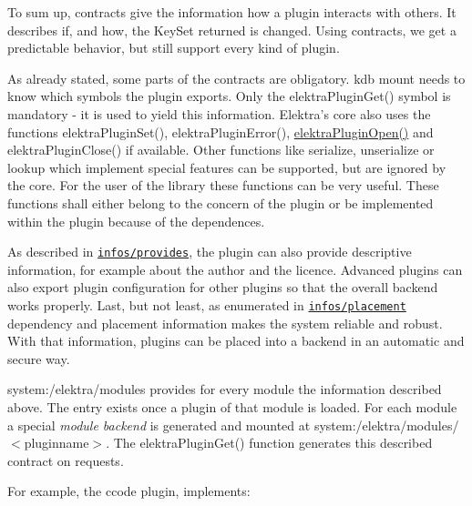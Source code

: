 To sum up, contracts give the information how a plugin interacts with others. It describes if, and how, the {\ttfamily Key\+Set} {\ttfamily returned} is changed. Using contracts, we get a predictable behavior, but still support every kind of plugin.

As already stated, some parts of the contracts are obligatory. {\ttfamily kdb mount} needs to know which symbols the plugin exports. Only the {\ttfamily elektra\+Plugin\+Get()} symbol is mandatory -\/ it is used to yield this information. Elektra’s core also uses the functions {\ttfamily elektra\+Plugin\+Set()}, {\ttfamily elektra\+Plugin\+Error()}, {\ttfamily \hyperlink{elektra_2plugin_8c_a32a70a7876542c51d153164ac5108a57}{elektra\+Plugin\+Open()}} and {\ttfamily elektra\+Plugin\+Close()} if available. Other functions like {\ttfamily serialize}, {\ttfamily unserialize} or {\ttfamily lookup} which implement special features can be supported, but are ignored by the core. For the user of the library these functions can be very useful. These functions shall either belong to the concern of the plugin or be implemented within the plugin because of the dependences.

As described in \href{/home/jenkins/workspace/libelektra-release/doc/CONTRACT.ini}{\tt infos/provides}, the plugin can also provide descriptive information, for example about the author and the licence. Advanced plugins can also export plugin configuration for other plugins so that the overall backend works properly. Last, but not least, as enumerated in \href{/home/jenkins/workspace/libelektra-release/doc/CONTRACT.ini}{\tt infos/placement} dependency and placement information makes the system reliable and robust. With that information, plugins can be placed into a backend in an automatic and secure way.

{\ttfamily system\+:/elektra/modules} provides for every module the information described above. The entry exists once a plugin of that module is loaded. For each module a special {\itshape module backend} is generated and mounted at {\ttfamily system\+:/elektra/modules/$<$pluginname$>$}. The {\ttfamily elektra\+Plugin\+Get()} function generates this described contract on requests.

For example, the ccode plugin, implements\+:


